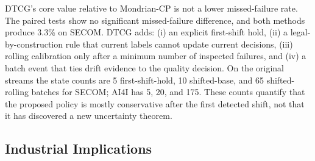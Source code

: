 \documentclass[journal]{IEEEtran}
\begin{document}
DTCG's core value relative to Mondrian-CP is not a lower missed-failure rate. The paired tests show no significant missed-failure difference, and both methods produce 3.3\% on SECOM. DTCG adds: (i) an explicit first-shift hold, (ii) a legal-by-construction rule that current labels cannot update current decisions, (iii) rolling calibration only after a minimum number of inspected failures, and (iv) a batch event that ties drift evidence to the quality decision. On the original streams the state counts are 5 first-shift-hold, 10 shifted-base, and 65 shifted-rolling batches for SECOM; AI4I has 5, 20, and 175. These counts quantify that the proposed policy is mostly conservative after the first detected shift, not that it has discovered a new uncertainty theorem.

\subsection{Industrial Implications}
\label{sec:implications}
\end{document}
